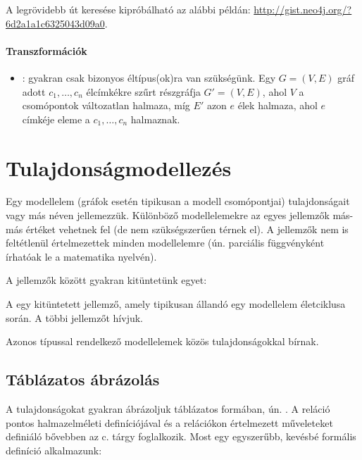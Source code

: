 A legrövidebb út keresése kipróbálható az alábbi példán: \url{http://gist.neo4j.org/?6d2a1a1c6325043d09a0}.

\paragraph{Transzformációk}

\begin{itemize}
\item {}: gyakran csak bizonyos éltípus(ok)ra van szükségünk. Egy $G = (V, E)$ gráf adott $c_1, \dots, c_n$ élcímkékre szűrt részgráfja $G' = (V, E)$, ahol $V$ a csomópontok változatlan halmaza, míg $E'$ azon $e$ élek halmaza, ahol $e$ címkéje eleme a $c_1, \dots, c_n$ halmaznak.
\end{itemize}



\section{Tulajdonságmodellezés}

Egy modellelem (gráfok esetén tipikusan a modell csomópontjai) tulajdonságait  vagy más néven  jellemezzük. Különböző modellelemekre az egyes jellemzők más-más értéket vehetnek fel (de nem szükségszerűen térnek el). A jellemzők nem is feltétlenül értelmezettek minden modellelemre (ún. parciális függvényként írhatóak le a matematika nyelvén).

A jellemzők között gyakran kitüntetünk egyet:

\begin{definicio}
A  egy kitüntetett jellemző, amely tipikusan állandó egy modellelem életciklusa során. A többi jellemzőt  hívjuk.
\end{definicio}

Azonos típussal rendelkező modellelemek közös tulajdonságokkal bírnak.

\subsection{Táblázatos ábrázolás}

A tulajdonságokat gyakran ábrázoljuk táblázatos formában, ún. . A reláció pontos halmazelméleti definíciójával és a relációkon értelmezett műveleteket definiáló  bővebben az \adatb c. tárgy foglalkozik. Most egy egyszerűbb, kevésbé formális definíció alkalmazunk:

